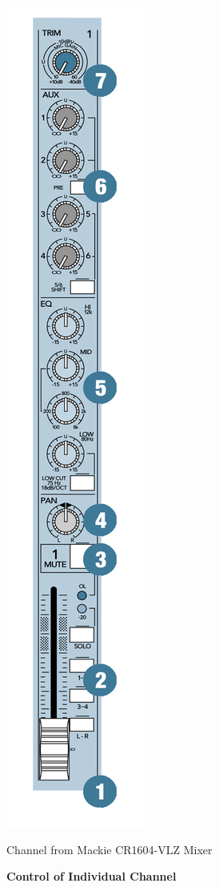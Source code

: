 \documentclass{tufte-book} %
\begin{document}
\newpage

\begin{marginfigure}
\includegraphics[width=\linewidth]{Mackie.png}
\caption{Channel from Mackie CR1604-VLZ Mixer}
\label{fig:marginfig}
\end{marginfigure}
\begin{fullwidth}
\textbf{Control of Individual Channel}
\end{fullwidth}
\end{document}
